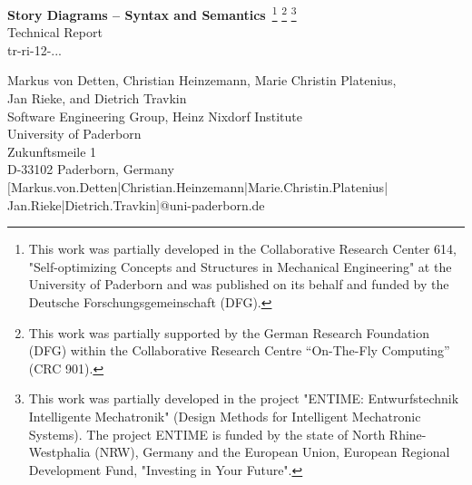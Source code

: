 \documentclass[12pt,a4paper,twoside,titlepage,openright,headsepline,listof=totoc,index=totoc,chapterprefix,bibliography=totoc,noenddot,%
numbers=noenddot, %
]{scrreprt}
\theoremstyle{break}
\begin{document}


	\setcounter{page}{1}

	\begin{titlepage}
	\thispagestyle{empty}
	{\center

			\vspace{1.5cm}
            {\LARGE  {\bf Story Diagrams -- Syntax and Semantics}\,
             \footnote{This work was partially developed in the Collaborative Research Center %
             614, "Self-optimizing Concepts and Structures in Mechanical Engineering" at the University of Paderborn
             and was published on its behalf and funded by the Deutsche Forschungsgemeinschaft (DFG).}
             \footnote{This work was partially supported by the German Research Foundation (DFG) within the 
             Collaborative Research Centre ``On-The-Fly Computing'' (CRC 901).}
             \footnote{This work was partially developed in the project "ENTIME: Entwurfstechnik Intelligente Mechatronik" (Design Methods for Intelligent Mechatronic Systems).
             The project ENTIME is funded by the state of North Rhine-Westphalia (NRW), Germany and the European Union, European Regional Development Fund, "Investing in Your Future".}}
			\\
			\vspace{1.5cm}
			{\Large Technical Report} \\[0.2cm]
			{\large tr-ri-12-...} \\
			\vspace{1cm}
			 
			
			Markus von Detten, Christian Heinzemann, Marie Christin Platenius, \\
			Jan Rieke, and Dietrich Travkin \\
			Software Engineering Group, Heinz Nixdorf Institute\\
			University of Paderborn\\
			Zukunftsmeile 1\\
			D-33102 Paderborn, Germany\\
			$[$Markus.von.Detten|Christian.Heinzemann|Marie.Christin.Platenius|\\
			Jan.Rieke|Dietrich.Travkin$]$@uni-paderborn.de\\

}
\end{titlepage}
\end{document}
